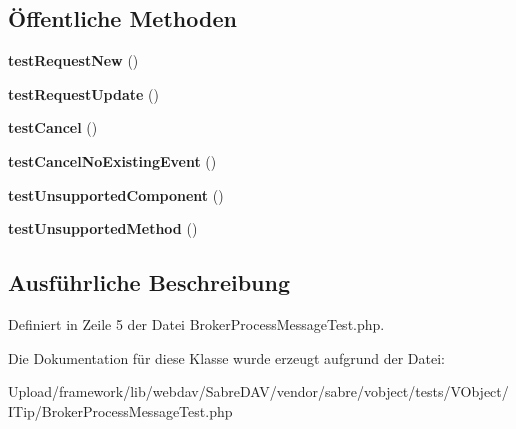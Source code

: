 \subsection*{Öffentliche Methoden}
\begin{DoxyCompactItemize}
\item 
\mbox{\label{class_sabre_1_1_v_object_1_1_i_tip_1_1_broker_process_message_test_af0785203b7a9ecc7e08acafeb40cc2cf}} 
{\bfseries test\+Request\+New} ()
\item 
\mbox{\label{class_sabre_1_1_v_object_1_1_i_tip_1_1_broker_process_message_test_af02e01be8e3878f050377eb5d1a26d21}} 
{\bfseries test\+Request\+Update} ()
\item 
\mbox{\label{class_sabre_1_1_v_object_1_1_i_tip_1_1_broker_process_message_test_a118cbf39e3e8e9e60cf20f95ea091fea}} 
{\bfseries test\+Cancel} ()
\item 
\mbox{\label{class_sabre_1_1_v_object_1_1_i_tip_1_1_broker_process_message_test_a676196f3036925c6251645b621ce30ba}} 
{\bfseries test\+Cancel\+No\+Existing\+Event} ()
\item 
\mbox{\label{class_sabre_1_1_v_object_1_1_i_tip_1_1_broker_process_message_test_a13bf4ed6e6fce5e6973c4482ff08d468}} 
{\bfseries test\+Unsupported\+Component} ()
\item 
\mbox{\label{class_sabre_1_1_v_object_1_1_i_tip_1_1_broker_process_message_test_abf0274172778a1a6aa1fa71f22b826c1}} 
{\bfseries test\+Unsupported\+Method} ()
\end{DoxyCompactItemize}


\subsection{Ausführliche Beschreibung}


Definiert in Zeile 5 der Datei Broker\+Process\+Message\+Test.\+php.



Die Dokumentation für diese Klasse wurde erzeugt aufgrund der Datei\+:\begin{DoxyCompactItemize}
\item 
Upload/framework/lib/webdav/\+Sabre\+D\+A\+V/vendor/sabre/vobject/tests/\+V\+Object/\+I\+Tip/Broker\+Process\+Message\+Test.\+php\end{DoxyCompactItemize}
